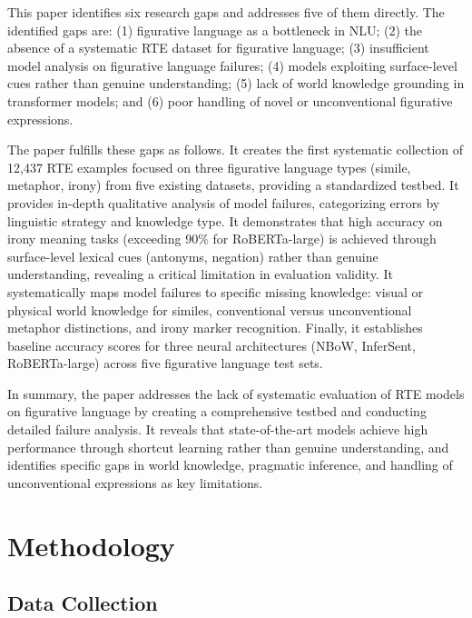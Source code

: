 \documentclass[12pt]{article}
\begin{document}
This paper identifies six research gaps and addresses five of them directly. The identified gaps are: (1) figurative language as a bottleneck in NLU; (2) the absence of a systematic RTE dataset for figurative language; (3) insufficient model analysis on figurative language failures; (4) models exploiting surface-level cues rather than genuine understanding; (5) lack of world knowledge grounding in transformer models; and (6) poor handling of novel or unconventional figurative expressions.

The paper fulfills these gaps as follows. It creates the first systematic collection of 12,437 RTE examples focused on three figurative language types (simile, metaphor, irony) from five existing datasets, providing a standardized testbed. It provides in-depth qualitative analysis of model failures, categorizing errors by linguistic strategy and knowledge type. It demonstrates that high accuracy on irony meaning tasks (exceeding 90\% for RoBERTa-large) is achieved through surface-level lexical cues (antonyms, negation) rather than genuine understanding, revealing a critical limitation in evaluation validity. It systematically maps model failures to specific missing knowledge: visual or physical world knowledge for similes, conventional versus unconventional metaphor distinctions, and irony marker recognition. Finally, it establishes baseline accuracy scores for three neural architectures (NBoW, InferSent, RoBERTa-large) across five figurative language test sets.

In summary, the paper addresses the lack of systematic evaluation of RTE models on figurative language by creating a comprehensive testbed and conducting detailed failure analysis. It reveals that state-of-the-art models achieve high performance through shortcut learning rather than genuine understanding, and identifies specific gaps in world knowledge, pragmatic inference, and handling of unconventional expressions as key limitations.

\section{Methodology}

\subsection{Data Collection}
\end{document}
